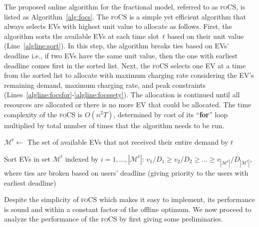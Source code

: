\documentclass[journal]{IEEEtran}
\newcommand{\revv}[1]{{\color{black}#1}}%
\newcommand{\focs}{\textsc{foCS}\xspace}
\begin{document}
The proposed online algorithm for the fractional model, referred to as \focs, is listed as Algorithm~\ref{alg:focs}. The \focs is a simple yet efficient algorithm that always selects EVs with highest unit value to allocate as follows. First, the algorithm sorts the available EVs at each time slot~$t$ based on their unit value (Line~\ref{algline:sort}). \revv{In this step, the algorithm breaks ties based on EVs' deadline i.e., if two EVs have the same unit value, then the one with earliest deadline comes first in the sorted list.} Next, the \focs selects one EV at a time from the sorted list to allocate with maximum charging rate considering the EV's remaining demand, maximum charging rate, and peak constraints (Lines~\ref{algline:focsfor}-\ref{algline:focssety}). The allocation is continued until all resources are allocated or there is no more EV that could be allocated. 
The time complexity of the \focs is $O(n^2T)$, determined by cost of its ``\textbf{for}'' loop multiplied by total number of times that the algorithm needs to be run.

\begin{algorithm}%
\footnotesize
\caption{\focs: $\forall t\in \{1,2,\dots ,T\}$}
\label{alg:focs}
\DontPrintSemicolon 



\BlankLine

$\mathcal{M}^t\leftarrow$ The set of available EVs that not received their entire demand by $t$ 

Sort EVs in set $\mathcal{M}^t$ indexed by $i=1,\dots ,|\mathcal{M}^t|$: $v_1/D_1\geq v_2/D_2\geq\dots\geq v_{|\mathcal{M}^t|}/D_{|\mathcal{M}^t|},$  \revv{where ties are broken based on users' deadline (giving priority to the users with earliest deadline) }\label{algline:sort}


\end{algorithm}
Despite the simplicity of \focs which makes it easy to implement, its performance is sound and within a constant factor of the offline optimum. We now proceed to analyze the performance of the \focs by first giving some preliminaries. 
\end{document}
